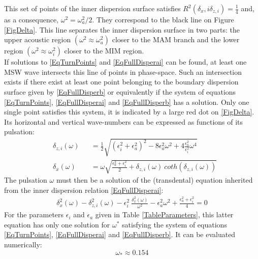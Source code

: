 \documentclass[a4paper,11pt]{article}
\begin{document}
This set of points of the inner dispersion surface satisfies $\displaystyle R^2(\delta_x,i \delta_{z,i})= \frac{1}{4}$ and, as a consequence,
$\omega^2=\omega_a^2/2$. They correspond to the black line on Figure \ref{FigDelta}. This line separates the inner dispersion surface in two parts: the upper acoustic region $(\omega^2\approx\omega_a^2)$ closer to the MAM branch and the lower region $(\omega^2\approx\omega_i^2)$ closer to the MIM region.\\
If solutions to \ref{EqTurnPoints} and \ref{EqFullDisperai} can be found, at least one MSW wave intersects this line of points in phase-space. Such an intersection exists if there exist at least one point belonging to the boundary dispersion surface given by \ref{EqFullDisperb} or equivalently if the system of equations \ref{EqTurnPoints}, \ref{EqFullDisperai} and \ref{EqFullDisperb} has a solution. Only one single point satisfies this system, it is indicated by a large red dot on \ref{FigDelta}. Its horizontal and vertical wave-numbers can be expressed as functions of its pulsation:
\begin{subequations}
	\begin{alignat}{2}	
	   \label{ParamSolDelta}
	   &\delta_{z,i}(\omega) && =\frac{1}{2} 
	   \sqrt{(\epsilon_i^2+\epsilon_a^2)^2 
	   - 8 \epsilon_a^2 \omega^2
	   + 4 \frac{\epsilon_a^2}{\epsilon_i^2} \omega^4}\\[3mm]
	   &\delta_x(\omega) &&=\omega
	   \sqrt{\frac{\epsilon_a^2+\epsilon_i^2}{2}
	   +\delta_{z,i}(\omega)\ coth(\delta_{z,i}(\omega))}
	\end{alignat}
\end{subequations}
The pulsation $\omega$ must then be a solution of the (transdental) equation inherited from the inner dispersion relation \ref{EqFullDisperai}:
\begin{subequations}
	\begin{alignat}{2}	
	   \label{ParamSolDelta2}
 		\delta_x^2(\omega)-\delta_{z,i}^2(\omega) 
 		-\epsilon_i^2\ \frac{\delta_x^2(\omega)}
 			{\omega^2}-\epsilon_a^2\omega^2
 		+\frac{\epsilon_a^2+\epsilon_i^2}{4} = 0
	\end{alignat}
\end{subequations}
For the parameters $\epsilon_i$ and $\epsilon_a$ given in Table \ref{TableParameters}, this latter equation has only one solution for $\omega^*$ satisfying the system of equations \ref{EqTurnPoints}, \ref{EqFullDisperai} and \ref{EqFullDisperb}. It can be evaluated numerically:
\begin{equation}
	\omega_* \approx 0.154
\end{equation}
\end{document}

